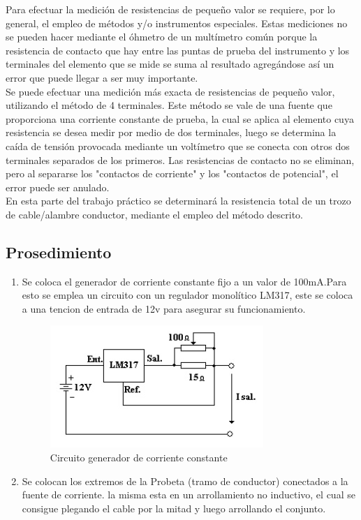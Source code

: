 \documentclass[12pt, letterpaper]{article}
\begin{document}
Para efectuar la medición de resistencias de pequeño valor se requiere, por lo general, el
empleo de métodos y/o instrumentos especiales. Estas mediciones no se pueden hacer
mediante el óhmetro de un multímetro común porque la resistencia de contacto que hay entre
las puntas de prueba del instrumento y los terminales del elemento que se mide se suma al
resultado agregándose así un error que puede llegar a ser muy importante.
\\
Se puede efectuar una medición más exacta de resistencias de pequeño valor, utilizando el método de 4 terminales. 
Este método se vale de una fuente que proporciona una corriente constante de prueba, la cual se aplica al elemento cuya resistencia
se desea medir por medio de dos terminales, luego se determina la caída de tensión provocada
mediante un voltímetro que se conecta con otros dos terminales separados de los primeros.
Las resistencias de contacto no se eliminan, pero al separarse los "contactos de corriente" y
los "contactos de potencial", el error puede ser anulado.
\\
En esta parte del trabajo práctico se determinará la resistencia total de un
trozo de cable/alambre conductor, mediante el empleo del método descrito. 
\\




\subsection{Prosedimiento}

\begin{enumerate}
	\item Se coloca el generador de corriente constante fijo a un valor de 100mA.Para esto se emplea un circuito con un regulador monolítico
	LM317, este se coloca a una tencion de entrada de 12v para asegurar su funcionamiento.
	
	\begin{figure}[h]
		\centering
		\includegraphics{Imagenes/circuito_lm317.jpg}
		\caption{Circuito generador de corriente constante}
	\end{figure}

	\item Se colocan los extremos de la Probeta (tramo de conductor) conectados a la fuente de corriente. la misma esta en un 
	arrollamiento no inductivo, el cual se consigue plegando el cable por la mitad y luego arrollando el conjunto.

\end{enumerate}
\end{document}
